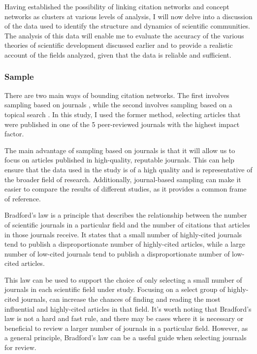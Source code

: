 Having established the possibility of linking citation networks and concept networks as clusters at various levels of analysis, I will now delve into a discussion of the data used to identify the structure and dynamics of scientific communities. The analysis of this data will enable me to evaluate the accuracy of the various theories of scientific development discussed earlier and to provide a realistic account of the fields analyzed, given that the data is reliable and sufficient.

\subsubsection{Sample}

There are two main ways of bounding citation networks. The first involves sampling based on journals \citep{beam2014, moody2006}, while the second involves sampling based on a topical search \citep{borrett2014,callon2005,chavalarias2013}. In this study, I used the former method, selecting articles that were published in one of the 5 peer-reviewed journals with the highest impact factor.

The main advantage of sampling based on journals is that it will allow us to focus on articles published in high-quality, reputable journals. This can help ensure that the data used in the study is of a high quality and is representative of the broader field of research. Additionally, journal-based sampling can make it easier to compare the results of different studies, as it provides a common frame of reference.

Bradford's law \citep{bradford1985, hjorland2005} is a principle that describes the relationship between the number of scientific journals in a particular field and the number of citations that articles in those journals receive. It states that a small number of highly-cited journals tend to publish a disproportionate number of highly-cited articles, while a large number of low-cited journals tend to publish a disproportionate 
number of low-cited articles.

This law can be used to support the choice of only selecting a small number of journals in each scientific field under study. Focusing on a select group of highly-cited journals, can increase the chances of finding and reading the most influential and highly-cited articles in that field. It's worth noting that Bradford's law is not a hard and fast rule, and there may be cases where it is necessary or beneficial to review a larger number of journals in a particular field. However, as a general principle, Bradford's law can be a useful guide when selecting journals for review.

